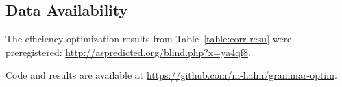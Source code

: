 \documentclass[9pt,twocolumn,twoside,lineno]{pnas-new}
\begin{document}
{%

\subsection*{Data Availability}
The efficiency optimization results from Table~\ref{table:corr-resu} were preregistered: \url{ http://aspredicted.org/blind.php?x=ya4qf8}.

Code and results are available at \url{https://github.com/m-hahn/grammar-optim}.

}



\showmatmethods{} %



\showacknow{} %


%
%

\end{document}
